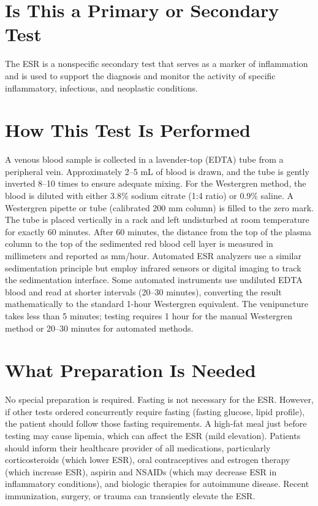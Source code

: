 \section*{Is This a Primary or Secondary Test}
The ESR is a nonspecific secondary test that serves as a marker of inflammation and is used to support the diagnosis and monitor the activity of specific inflammatory, infectious, and neoplastic conditions.

\section*{How This Test Is Performed}
A venous blood sample is collected in a lavender-top (EDTA) tube from a peripheral vein. Approximately 2--5 mL of blood is drawn, and the tube is gently inverted 8--10 times to ensure adequate mixing. For the Westergren method, the blood is diluted with either 3.8\% sodium citrate (1:4 ratio) or 0.9\% saline. A Westergren pipette or tube (calibrated 200 mm column) is filled to the zero mark. The tube is placed vertically in a rack and left undisturbed at room temperature for exactly 60 minutes. After 60 minutes, the distance from the top of the plasma column to the top of the sedimented red blood cell layer is measured in millimeters and reported as mm/hour. Automated ESR analyzers use a similar sedimentation principle but employ infrared sensors or digital imaging to track the sedimentation interface. Some automated instruments use undiluted EDTA blood and read at shorter intervals (20--30 minutes), converting the result mathematically to the standard 1-hour Westergren equivalent. The venipuncture takes less than 5 minutes; testing requires 1 hour for the manual Westergren method or 20--30 minutes for automated methods.

\section*{What Preparation Is Needed}
No special preparation is required. Fasting is not necessary for the ESR. However, if other tests ordered concurrently require fasting (fasting glucose, lipid profile), the patient should follow those fasting requirements. A high-fat meal just before testing may cause lipemia, which can affect the ESR (mild elevation). Patients should inform their healthcare provider of all medications, particularly corticosteroids (which lower ESR), oral contraceptives and estrogen therapy (which increase ESR), aspirin and NSAIDs (which may decrease ESR in inflammatory conditions), and biologic therapies for autoimmune disease. Recent immunization, surgery, or trauma can transiently elevate the ESR.

